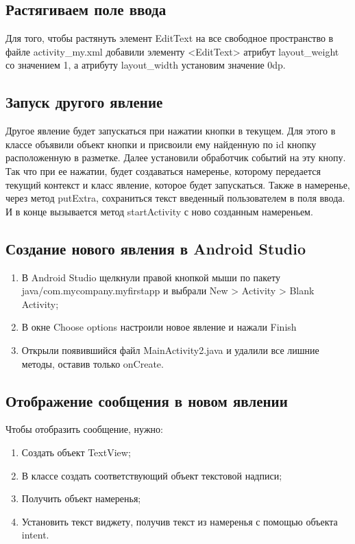 

\subsection{Растягиваем поле ввода}
Для того, чтобы растянуть элемент EditText на все свободное пространство в файле activity\_my.xml добавили элементу
<EditText> атрибут layout\_weight со значением 1, а атрибуту layout\_width установим значение 0dp.


\subsection{Запуск другого явление}
Другое явление будет запускаться при нажатии кнопки в текущем.
Для этого в классе объявили объект кнопки и присвоили ему найденную по id кнопку расположенную в разметке.
Далее установили обработчик событий на эту кнопу.
Так что при ее нажатии, будет создаваться намеренье, которому передается текущий контекст и класс явление,
которое будет запускаться.
Также в намеренье, через метод putExtra, сохраниться текст введенный пользователем в поля ввода.
И в конце вызывается метод startActivity с ново созданным намереньем.


\subsection{Создание нового явления в Android Studio}
\begin{enumerate}
	\item В Android Studio щелкнули правой кнопкой мыши по пакету java/com.mycompany.myfirstapp и выбрали New > Activity > Blank Activity;
	\item В окне Choose options настроили новое явление и нажали Finish
	\item Открыли появившийся файл MainActivity2.java и удалили все лишние методы, оставив только onCreate.
\end{enumerate}

\subsection{Отображение сообщения в новом явлении}
Чтобы отобразить сообщение, нужно:
\begin{enumerate}
	\item Создать объект TextView;
	\item В классе создать соответствующий объект текстовой надписи;
	\item Получить объект намеренья;
	\item Установить текст виджету, получив текст из намеренья с помощью объекта intent.
\end{enumerate}

